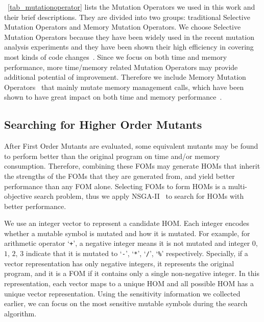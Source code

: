 \documentclass[oribibl]{llncs}
\begin{document}
\tablename~\ref{tab_mutationoperator} lists the Mutation Operators we used in this work and their brief descriptions.
They are divided into two groups: traditional Selective Mutation Operators and Memory Mutation Operators.
We choose Selective Mutation Operators because they have been widely used in the recent mutation analysis experiments and they have been shown their high efficiency in covering most kinds of code changes~\cite{5487526}.
Since we focus on both time and memory performance, more time/memory related Mutation Operators may provide additional potential of improvement.
Therefore we include Memory Mutation Operators~\cite{7107449,Wu2016} that mainly mutate memory management calls, which have been shown to have great impact on both time and memory performance~\cite{Zorn:1992:EMS:142181.142200}.

\subsection{Searching for Higher Order Mutants}
\label{sec_hom}

After First Order Mutants are evaluated, some equivalent mutants may be found to perform better than the original program on time and/or memory consumption.
Therefore, combining these FOMs may generate HOMs that inherit the strengths of the FOMs that they are generated from, and yield better performance than any FOM alone.
Selecting FOMs to form HOMs is a multi-objective search problem, thus we apply NSGA-II~\cite{996017} to search for HOMs with better performance.

We use an integer vector to represent a candidate HOM.
Each integer encodes whether a mutable symbol is mutated and how it is mutated.
For example, for arithmetic operator `\texttt{+}', a negative integer means it is not mutated and integer $0$, $1$, $2$, $3$ indicate that it is mutated to `\texttt{-}', `\texttt{*}', `\texttt{/}', `\texttt{\%}' respectively.
Specially, if a vector representation has only negative integers, it represents the original program, and it is a FOM if it contains only a single non-negative integer.
In this representation, each vector maps to a unique HOM and all possible HOM has a unique vector representation.
Using the sensitivity information we collected earlier, we can focus on the most sensitive mutable symbols during the search algorithm.
\end{document}
